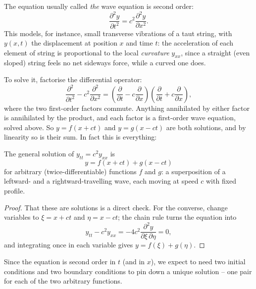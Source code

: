 \documentclass[a4paper]{scrartcl}
\begin{document}
The equation usually called \emph{the} wave equation is second order:
$$
\frac{\partial^2 y}{\partial t^2} = c^2 \frac{\partial^2 y}{\partial x^2}.
$$
This models, for instance, small transverse vibrations of a taut string, with $y(x, t)$ the displacement at position $x$ and time $t$: the acceleration of each element of string is proportional to the local \emph{curvature} $y_{xx}$, since a straight (even sloped) string feels no net sideways force, while a curved one does.

To solve it, factorise the differential operator:
$$
\frac{\partial^2}{\partial t^2} - c^2 \frac{\partial^2}{\partial x^2} = \left(\frac{\partial}{\partial t} - c \frac{\partial}{\partial x}\right)\left(\frac{\partial}{\partial t} + c\frac{\partial}{\partial x}\right),
$$
where the two first-order factors commute. Anything annihilated by either factor is annihilated by the product, and each factor is a first-order wave equation, solved above. So $y = f(x + ct)$ and $y = g(x - ct)$ are both solutions, and by linearity so is their sum. In fact this is everything:

\begin{proposition}
	The general solution of $y_{tt} = c^2 y_{xx}$ is
	$$
	y = f(x + ct) + g(x - ct)
	$$
	for arbitrary (twice-differentiable) functions $f$ and $g$: a superposition of a leftward- and a rightward-travelling wave, each moving at speed $c$ with fixed profile.
\end{proposition}
\begin{proof}
	That these are solutions is a direct check. For the converse, change variables to $\xi = x + ct$ and $\eta = x - ct$; the chain rule turns the equation into
	$$
	y_{tt} - c^2 y_{xx} = -4c^2 \frac{\partial^2 y}{\partial \xi \, \partial \eta} = 0,
	$$
	and integrating once in each variable gives $y = f(\xi) + g(\eta)$.
\end{proof}

Since the equation is second order in $t$ (and in $x$), we expect to need two initial conditions and two boundary conditions to pin down a unique solution -- one pair for each of the two arbitrary functions.
\end{document}
